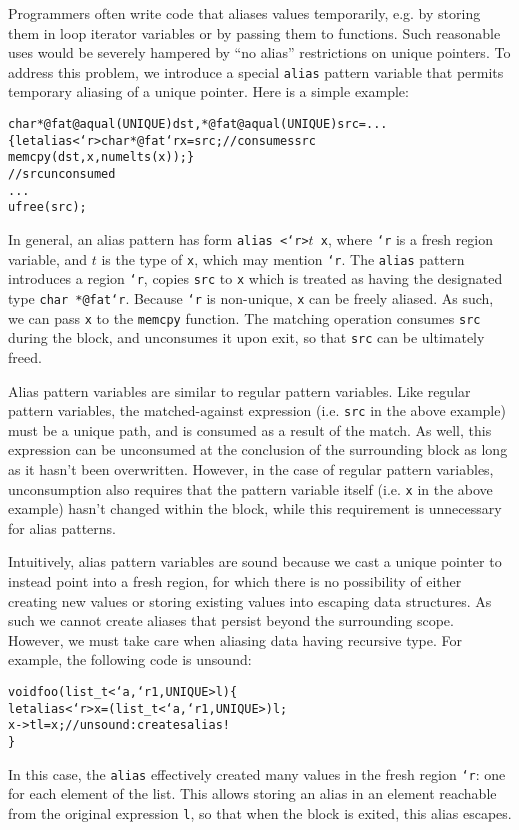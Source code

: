 Programmers often write code that aliases values temporarily, e.g. by
storing them in loop iterator variables or by passing them to functions.
Such reasonable uses would be severely hampered by ``no alias'' restrictions
on unique pointers.  To address this problem, we introduce a special
\texttt{alias} pattern variable that permits temporary aliasing of a unique
pointer.  Here is a simple example:
\begin{alltt}
  char *@fat@aqual(UNIQUE) dst, *@fat@aqual(UNIQUE) src = ...
  \{ let alias <`r>char *@fat`r x = src; // consumes src
    memcpy(dst,x,numelts(x)); \}
  // src unconsumed
  ...
  ufree(src);
\end{alltt}
In general, an alias pattern has form \texttt{alias <`r>$t$ x}, where
\texttt{`r} is a fresh region variable, and $t$ is the type of \texttt{x},
which may mention \texttt{`r}.  The \texttt{alias} pattern introduces a
region \texttt{`r}, copies \texttt{src} to \texttt{x} which is treated as
having the designated type \texttt{char *@fat`r}.  Because \texttt{`r} is
non-unique, \texttt{x} can be freely aliased.  As such, we can pass
\texttt{x} to the \texttt{memcpy} function.  The matching operation consumes
\texttt{src} during the block, and unconsumes it upon exit, so that
\texttt{src} can be ultimately freed.

Alias pattern variables are similar to regular pattern variables.  Like
regular pattern variables, the matched-against expression (i.e. \texttt{src}
in the above example) must be a unique path, and is consumed as a result of
the match.  As well, this expression can be unconsumed at the conclusion of
the surrounding block as long as it hasn't been overwritten.  However, in
the case of regular pattern variables, unconsumption also requires that the
pattern variable itself (i.e. \texttt{x} in the above example) hasn't
changed within the block, while this requirement is unnecessary for alias
patterns.

Intuitively, alias pattern variables are sound because we cast a unique
pointer to instead point into a fresh region, for which there is no
possibility of either creating new values or storing existing values into
escaping data structures.  As such we cannot create aliases that persist
beyond the surrounding scope.  However, we must take care when aliasing data
having recursive type.  For example, the following code is unsound:
\begin{alltt}
  void foo(list\_t<`a, `r1, UNIQUE> l) \{
    let alias <`r> x = (list\_t<`a, `r1, UNIQUE>)l;
    x->tl = x; // unsound: creates alias!
  \}
\end{alltt}
In this case, the \texttt{alias} effectively created many values in the
fresh region \texttt{`r}: one for each element of the list.  This allows
storing an alias in an element reachable from the original expression
\texttt{l}, so that when the block is exited, this alias escapes.

